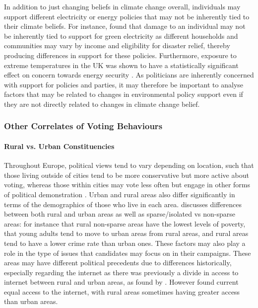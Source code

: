 \documentclass[preprint]{elsarticle} %
\begin{document}
In addition to just changing beliefs in climate change overall, individuals may support different electricity or energy policies that may not be inherently tied to their climate beliefs. For instance, \citet{osberghausCausalEffectFlood2019} found that damage to an individual may not be inherently tied to support for green electricity as different households and communities may vary by income and eligibility for disaster relief, thereby producing differences in support for these policies. Furthermore, exposure to extreme temperatures in the UK was shown to have a statistically significant effect on concern towards energy security \citep{larcomUKSummerHeatwave2019a}. As politicians are inherently concerned with support for policies and parties, it may therefore be important to analyse factors that may be related to changes in environmental policy support even if they are not directly related to changes in climate change belief. 



\subsubsection{Other Correlates of Voting Behaviours}

\paragraph{Rural vs. Urban Constituencies}

Throughout Europe, political views tend to vary depending on location, such that those living outside of cities tend to be more conservative but more active about voting, whereas those within cities may vote less often but engage in other forms of political demonstration \citep{kennyUrbanruralPolarisationPolitical2021}. Urban and rural areas also differ significantly in terms of the demographics of those who live in each area. \citet{patemanRuralUrbanAreas2011} discusses differences between both rural and urban areas as well as sparse/isolated vs non-sparse areas: for instance that rural non-sparse areas have the lowest levels of poverty, that young adults tend to move to urban areas from rural areas, and rural areas tend to have a lower crime rate than urban ones. These factors may also play a role in the type of issues that candidates may focus on in their campaigns. These areas may have different political precedents due to differences historically, especially regarding the internet as there was previously a divide in access to internet between rural and urban areas, as found by \citet{choudrieRealisingGovernmentUK2005}. However \citet{patemanRuralUrbanAreas2011} found current equal access to the internet, with rural areas sometimes having greater access than urban areas.
\end{document}
